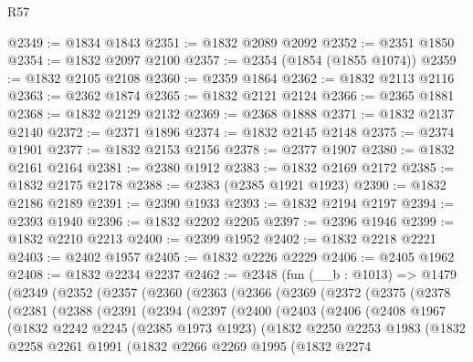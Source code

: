 \begin{lexlean}{R57}
\begin{coremodule}
@2349 := @1834 @1843
@2351 := @1832 @2089 @2092
@2352 := @2351 @1850
@2354 := @1832 @2097 @2100
@2357 := @2354 (@1854 (@1855 @1074))
@2359 := @1832 @2105 @2108
@2360 := @2359 @1864
@2362 := @1832 @2113 @2116
@2363 := @2362 @1874
@2365 := @1832 @2121 @2124
@2366 := @2365 @1881
@2368 := @1832 @2129 @2132
@2369 := @2368 @1888
@2371 := @1832 @2137 @2140
@2372 := @2371 @1896
@2374 := @1832 @2145 @2148
@2375 := @2374 @1901
@2377 := @1832 @2153 @2156
@2378 := @2377 @1907
@2380 := @1832 @2161 @2164
@2381 := @2380 @1912
@2383 := @1832 @2169 @2172
@2385 := @1832 @2175 @2178
@2388 := @2383 (@2385 @1921 @1923)
@2390 := @1832 @2186 @2189
@2391 := @2390 @1933
@2393 := @1832 @2194 @2197
@2394 := @2393 @1940
@2396 := @1832 @2202 @2205
@2397 := @2396 @1946
@2399 := @1832 @2210 @2213
@2400 := @2399 @1952
@2402 := @1832 @2218 @2221
@2403 := @2402 @1957
@2405 := @1832 @2226 @2229
@2406 := @2405 @1962
@2408 := @1832 @2234 @2237
@2462 := @2348
    (fun (__b : @1013) =>
    @1479
      (@2349
        (@2352
          (@2357
            (@2360
              (@2363
                (@2366
                  (@2369
                    (@2372
                      (@2375
                        (@2378
                          (@2381
                            (@2388
                              (@2391
                                (@2394
                                  (@2397
                                    (@2400
                                      (@2403
                                        (@2406
                                          (@2408
                                            @1967
                                            (@1832
                                              @2242
                                              @2245
                                              (@2385 @1973 @1923)
                                              (@1832
                                                @2250
                                                @2253
                                                @1983
                                                (@1832
                                                  @2258
                                                  @2261
                                                  @1991
                                                  (@1832
                                                    @2266
                                                    @2269
                                                    @1995
                                                    (@1832
                                                      @2274

\end{coremodule}
\end{lexlean}
